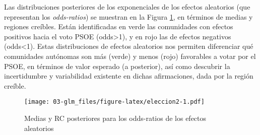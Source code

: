 \documentclass[
]{book}
\newenvironment{Shaded}{\begin{snugshade}}{\end{snugshade}}
\newcommand{\AttributeTok}[1]{\textcolor[rgb]{0.77,0.63,0.00}{#1}}
\newcommand{\DecValTok}[1]{\textcolor[rgb]{0.00,0.00,0.81}{#1}}
\newcommand{\FloatTok}[1]{\textcolor[rgb]{0.00,0.00,0.81}{#1}}
\newcommand{\FunctionTok}[1]{\textcolor[rgb]{0.00,0.00,0.00}{#1}}
\newcommand{\NormalTok}[1]{#1}
\newcommand{\OtherTok}[1]{\textcolor[rgb]{0.56,0.35,0.01}{#1}}
\newcommand{\SpecialCharTok}[1]{\textcolor[rgb]{0.00,0.00,0.00}{#1}}
\newcommand{\StringTok}[1]{\textcolor[rgb]{0.31,0.60,0.02}{#1}}
\begin{document}
Las distribuciones posteriores de los exponenciales de los efectos
aleatorios (que representan los \emph{odds-ratios}) se muestran en la Figura \ref{fig:eleccion2}, en términos de medias y regiones creíbles. Están identificadas en verde las comunidades con efectos positivos hacia el voto PSOE (odds\textgreater1), y en rojo las de efectos negativos (odds\textless1). Estas distribuciones de efectos aleatorios nos permiten diferenciar qué comunidades autónomas son más (verde) y menos (rojo) favorables a votar por el PSOE, en términos de valor esperado (a posterior), así como descubrir la incertidumbre y variabilidad existente en dichas afirmaciones, dada por la región creíble.

\begin{Shaded}
\end{Shaded}

\begin{figure}
\centering
\texttt{[image: 03-glm\_files/figure-latex/eleccion2-1.pdf]}
\caption{\label{fig:eleccion2}Medias y RC posteriores para los odds-ratios de los efectos aleatorios}
\end{figure}
\end{document}
